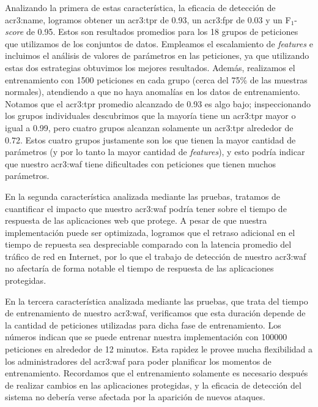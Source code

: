 Analizando la primera de estas característica, la eficacia de detección
de \gls{acr3:name}, logramos obtener un \gls{acr3:tpr} de \num{0.93},
un \gls{acr3:fpr} de \num{0.03} y un F$_{1}$-\textit{score} de \num{0.95}.
Estos son resultados promedios para los 18 grupos de peticiones que
utilizamos de los conjuntos de datos.
Empleamos el escalamiento de \textit{features} e incluimos el análisis
de valores de parámetros en las peticiones, ya que utilizando estas dos
estrategias obtuvimos los mejores resultados. Además, realizamos el
entrenamiento con 1500 peticiones en cada grupo (cerca del 75\% de las
muestras normales), atendiendo a que no haya anomalías en los datos de
entrenamiento.
Notamos que el \gls{acr3:tpr} promedio alcanzado de \num{0.93} es algo
bajo; inspeccionando los grupos individuales descubrimos que la mayoría
tiene un \gls{acr3:tpr} mayor o igual a \num{0.99}, pero cuatro grupos
alcanzan solamente un \gls{acr3:tpr} alrededor de \num{0.72}. Estos cuatro
grupos justamente son los que tienen la mayor cantidad de parámetros (y
por lo tanto la mayor cantidad de \textit{features}), y esto podría indicar
que nuestro \gls{acr3:waf} tiene dificultades con peticiones que tienen
muchos parámetros.

En la segunda característica analizada mediante las pruebas, tratamos
de cuantificar el impacto que nuestro \gls{acr3:waf} podría tener sobre
el tiempo de respuesta de las aplicaciones web que protege. A pesar de
que nuestra implementación puede ser optimizada, logramos que el retraso
adicional en el tiempo de repuesta sea despreciable comparado con la
latencia promedio del tráfico de red en Internet, por lo que el trabajo
de detección de nuestro \gls{acr3:waf} no afectaría de forma notable
el tiempo de respuesta de las aplicaciones protegidas.

En la tercera característica analizada mediante las pruebas, que trata
del tiempo de entrenamiento de nuestro \gls{acr3:waf}, verificamos que
esta duración depende de la cantidad de peticiones utilizadas para dicha
fase de entrenamiento. Los números indican que se puede entrenar nuestra
implementación con \num{100000} peticiones en alrededor de 12 minutos.
Esta rapidez le provee mucha flexibilidad a los administradores del
\gls{acr3:waf} para poder planificar los momentos de entrenamiento.
Recordamos que el entrenamiento solamente es necesario después de realizar
cambios en las aplicaciones protegidas, y la eficacia de detección del
sistema no debería verse afectada por la aparición de nuevos ataques.

